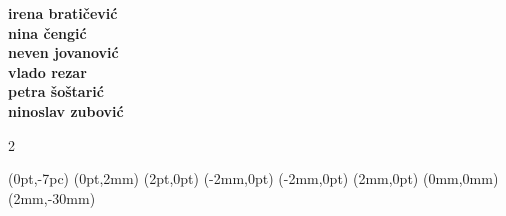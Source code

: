 \documentclass{article}
\begin{document}
  \NewCoffin \result
  \NewCoffin \aaa
  \NewCoffin \bbb
  \NewCoffin \ddd
  \NewCoffin \eee
  \NewCoffin \fff
  \NewCoffin {}
  \NewCoffin {}
  \NewCoffin {}

\SetHorizontalCoffin \result {}
\SetHorizontalCoffin {}
\SetHorizontalCoffin {}
\SetHorizontalCoffin {}
\SetHorizontalCoffin {}
\SetVerticalCoffin \fff {140pt}
                 {\raggedright {\color{gray} \fontsize{13}{14}\sffamily\bfseries
                 irena bratičević\\
                 nina čengić\\
                 neven jovanović\\
                 vlado rezar\\
                 petra šoštarić\\
                 ninoslav zubović\\
                 }}

\RotateCoffin {}

\ScaleCoffin {} {2}

\SetHorizontalCoffin {}
\SetHorizontalCoffin {}
\SetHorizontalCoffin {}


\JoinCoffins \result                \aaa	[B,l](0pt,-7pc)
\JoinCoffins {} (0pt,2mm)
\JoinCoffins {} \bbb     [B,r](2pt,0pt)
\JoinCoffins {} (-2mm,0pt)
\JoinCoffins {} \fff     [t,r](-2mm,0pt)
\JoinCoffins {} (2mm,0pt)
\JoinCoffins {} \ddd     [B,r](0mm,0mm)
\JoinCoffins {} \eee    [t,r](2mm,-30mm)
\TypesetCoffin \result
\end{document}
